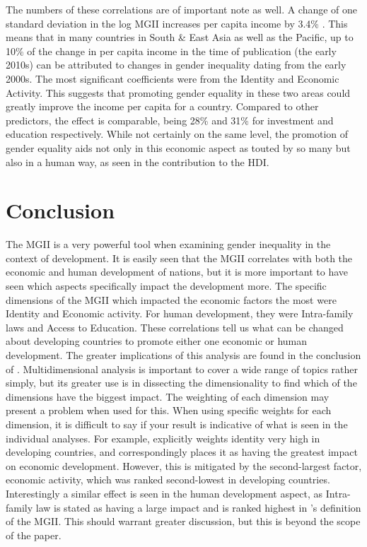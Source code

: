 \documentclass[12pt, letterpaper]{article}
\begin{document}
The numbers of these correlations are of important note as well. A change of one standard deviation in the log MGII increases per capita income by 3.4\% \cite{ferrant}. This means that in many countries in South \& East Asia as well as the Pacific, up to 10\% of the change in per capita income in the time of publication (the early 2010s) can be attributed to changes in gender inequality dating from the early 2000s. The most significant coefficients were from the Identity and Economic Activity. This suggests that promoting gender equality in these two areas could greatly improve the income per capita for a country. Compared to other predictors, the effect is comparable, being 28\% and 31\% for investment and education respectively. While not certainly on the same level, the promotion of gender equality aids not only in this economic aspect as touted by so many but also in a human way, as seen in the contribution to the HDI.

\section{Conclusion}
The MGII is a very powerful tool when examining gender inequality in the context of development. It is easily seen that the MGII correlates with both the economic and human development of nations, but it is more important to have seen which aspects specifically impact the development more. The specific dimensions of the MGII which impacted the economic factors the most were Identity and Economic activity. For human development, they were Intra-family laws and Access to Education. These correlations tell us what can be changed about developing countries to promote either one economic or human development. The greater implications of this analysis are found in the conclusion of \cite{ferrant}. Multidimensional analysis is important to cover a wide range of topics rather simply, but its greater use is in dissecting the dimensionality to find which of the dimensions have the biggest impact. The weighting of each dimension may present a problem when used for this. When using specific weights for each dimension, it is difficult to say if your result is indicative of what is seen in the individual analyses. For example, \cite{ferrant2} explicitly weights identity very high in developing countries, and correspondingly places it as having the greatest impact on economic development. However, this is mitigated by the second-largest factor, economic activity, which was ranked second-lowest in developing countries. Interestingly a similar effect is seen in the human development aspect, as Intra-family law is stated as having a large impact and is ranked highest in \cite{ferrant}'s definition of the MGII. This should warrant greater discussion, but this is beyond the scope of the paper.
\end{document}

